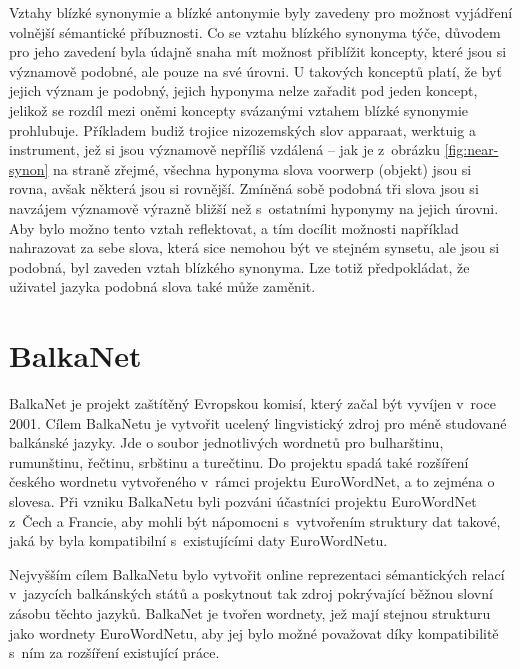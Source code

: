 \documentclass[a4paper, 11pt, oneside, showtrims]{book}
\newcommand\ex{\textsf}
\begin{document}
				Vztahy blízké synonymie a blízké antonymie byly zavedeny pro možnost vyjádření volnější sémantické příbuznosti. \parencite{pazienza2008bottom} Co se vztahu blízkého synonyma  týče, důvodem pro jeho zavedení byla údajně snaha mít možnost přiblížit koncepty, které jsou si významově podobné, ale pouze na své úrovni. U takových konceptů platí, že byť jejich význam je podobný, jejich hyponyma nelze zařadit pod jeden koncept, jelikož se rozdíl mezi oněmi koncepty svázanými vztahem blízké synonymie prohlubuje. Příkladem budiž trojice nizozemských slov \ex{apparaat}, \ex{werktuig} a \ex{instrument}, jež si jsou významově nepříliš vzdálená -- jak je z~obrázku \ref{fig:near-synon} na straně \pageref{fig:near-synon} zřejmé, všechna hyponyma slova \ex{voorwerp} (\ex{objekt}) jsou si rovna, avšak některá jsou si rovnější. Zmíněná sobě podobná tři slova jsou si navzájem významově výrazně bližší než s~ostatními hyponymy na jejich úrovni. Aby bylo možno tento vztah reflektovat, a tím docílit možnosti například nahrazovat za sebe slova, která sice nemohou být ve stejném synsetu, ale jsou si podobná, byl zaveden vztah blízkého synonyma. Lze totiž předpokládat, že uživatel jazyka podobná slova také může zaměnit. \parencite{vossen1997eurowordnet}

				
			\section{BalkaNet}
			\label{cha:balkanet}

				BalkaNet je projekt zaštítěný Evropskou komisí, který začal být vyvíjen v~roce 2001. Cílem BalkaNetu je vytvořit ucelený lingvistický zdroj pro méně studované balkánské jazyky. Jde o soubor jednotlivých wordnetů pro bulharštinu, rumunštinu, řečtinu, srbštinu a turečtinu. Do projektu spadá také rozšíření českého wordnetu vytvořeného v~rámci projektu EuroWordNet, a to zejména o slovesa. Při vzniku BalkaNetu byli pozváni účastníci projektu EuroWordNet z~Čech a Francie, aby mohli být nápomocni s~vytvořením struktury dat takové, jaká by byla kompatibilní s~existujícími daty EuroWordNetu. \parencite{tufis2004balkanet}

				Nejvyšším cílem BalkaNetu bylo vytvořit online reprezentaci sémantických relací v~jazycích balkánských států a poskytnout tak zdroj pokrývající běžnou slovní zásobu těchto jazyků. BalkaNet je tvořen wordnety, jež mají stejnou strukturu jako wordnety EuroWordNetu, aby jej bylo možné považovat díky kompatibilitě s~ním za rozšíření existující práce. 
\end{document}
